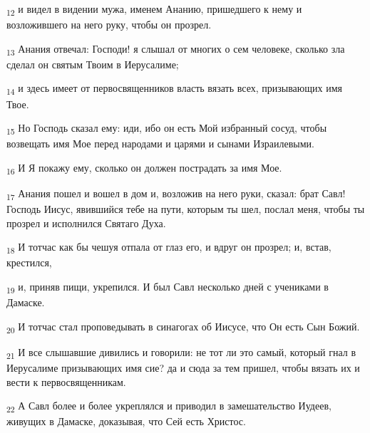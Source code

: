 \begin{tcolorbox}
\textsubscript{12} и видел в видении мужа, именем Ананию, пришедшего к нему и возложившего на него руку, чтобы он прозрел.
\end{tcolorbox}
\begin{tcolorbox}
\textsubscript{13} Анания отвечал: Господи! я слышал от многих о сем человеке, сколько зла сделал он святым Твоим в Иерусалиме;
\end{tcolorbox}
\begin{tcolorbox}
\textsubscript{14} и здесь имеет от первосвященников власть вязать всех, призывающих имя Твое.
\end{tcolorbox}
\begin{tcolorbox}
\textsubscript{15} Но Господь сказал ему: иди, ибо он есть Мой избранный сосуд, чтобы возвещать имя Мое перед народами и царями и сынами Израилевыми.
\end{tcolorbox}
\begin{tcolorbox}
\textsubscript{16} И Я покажу ему, сколько он должен пострадать за имя Мое.
\end{tcolorbox}
\begin{tcolorbox}
\textsubscript{17} Анания пошел и вошел в дом и, возложив на него руки, сказал: брат Савл! Господь Иисус, явившийся тебе на пути, которым ты шел, послал меня, чтобы ты прозрел и исполнился Святаго Духа.
\end{tcolorbox}
\begin{tcolorbox}
\textsubscript{18} И тотчас как бы чешуя отпала от глаз его, и вдруг он прозрел; и, встав, крестился,
\end{tcolorbox}
\begin{tcolorbox}
\textsubscript{19} и, приняв пищи, укрепился. И был Савл несколько дней с учениками в Дамаске.
\end{tcolorbox}
\begin{tcolorbox}
\textsubscript{20} И тотчас стал проповедывать в синагогах об Иисусе, что Он есть Сын Божий.
\end{tcolorbox}
\begin{tcolorbox}
\textsubscript{21} И все слышавшие дивились и говорили: не тот ли это самый, который гнал в Иерусалиме призывающих имя сие? да и сюда за тем пришел, чтобы вязать их и вести к первосвященникам.
\end{tcolorbox}
\begin{tcolorbox}
\textsubscript{22} А Савл более и более укреплялся и приводил в замешательство Иудеев, живущих в Дамаске, доказывая, что Сей есть Христос.
\end{tcolorbox}
